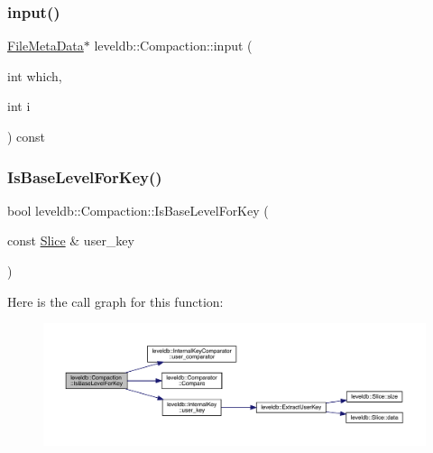 \subsubsection{\texorpdfstring{input()}{input()}}
{\footnotesize\ttfamily \mbox{\hyperlink{structleveldb_1_1_file_meta_data}{File\+Meta\+Data}}$\ast$ leveldb\+::\+Compaction\+::input (\begin{DoxyParamCaption}\item[{int}]{which,  }\item[{int}]{i }\end{DoxyParamCaption}) const\hspace{0.3cm}{\ttfamily [inline]}}

\mbox{\label{classleveldb_1_1_compaction_ae982beb6ee52d92de76a363ef0eefc29}} 
\subsubsection{\texorpdfstring{IsBaseLevelForKey()}{IsBaseLevelForKey()}}
{\footnotesize\ttfamily bool leveldb\+::\+Compaction\+::\+Is\+Base\+Level\+For\+Key (\begin{DoxyParamCaption}\item[{const \mbox{\hyperlink{classleveldb_1_1_slice}{Slice}} \&}]{user\+\_\+key }\end{DoxyParamCaption})}

Here is the call graph for this function\+:
\nopagebreak
\begin{figure}[H]
\begin{center}
\leavevmode
\includegraphics[width=350pt]{classleveldb_1_1_compaction_ae982beb6ee52d92de76a363ef0eefc29_cgraph}
\end{center}
\end{figure}
\mbox{\label{classleveldb_1_1_compaction_a85ab53d400d49d1dfb7e8f63017fef99}} 
